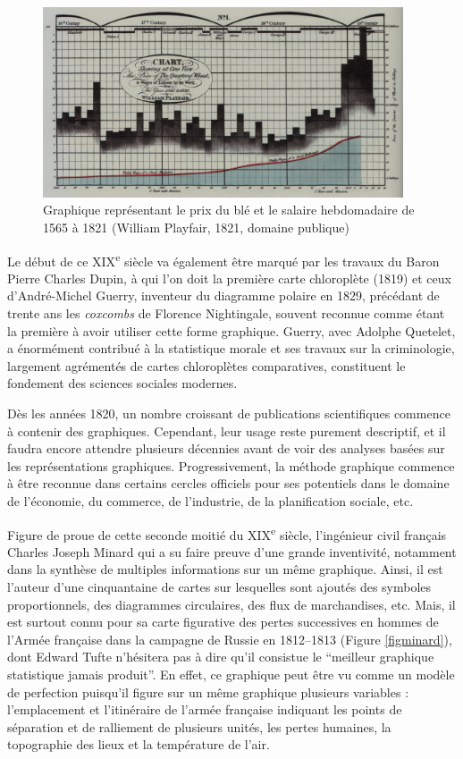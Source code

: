 \documentclass[]{article}
\begin{document}
\begin{figure}
\centering
\includegraphics[width=0.95\textwidth,height=\textheight]{img/chap1/playfair.png}
\caption{Graphique représentant le prix du blé et le salaire hebdomadaire de 1565 à 1821 (William Playfair, 1821, domaine publique)}
\end{figure}

Le début de ce XIX\textsuperscript{e} siècle va également être marqué par les travaux du Baron Pierre Charles Dupin, à qui l'on doit la première carte chloroplète (1819) et ceux d'André-Michel Guerry, inventeur du diagramme polaire en 1829, précédant de trente ans les \emph{coxcombs} de Florence Nightingale, souvent reconnue comme étant la première à avoir utiliser cette forme graphique. Guerry, avec Adolphe Quetelet, a énormément contribué à la statistique morale et ses travaux sur la criminologie, largement agrémentés de cartes chloroplètes comparatives, constituent le fondement des sciences sociales modernes.

Dès les années 1820, un nombre croissant de publications scientifiques commence à contenir des graphiques. Cependant, leur usage reste purement descriptif, et il faudra encore attendre plusieurs décennies avant de voir des analyses basées sur les représentations graphiques. Progressivement, la méthode graphique commence à être reconnue dans certains cercles officiels pour ses potentiels dans le domaine de l'économie, du commerce, de l'industrie, de la planification sociale, etc.

Figure de proue de cette seconde moitié du XIX\textsuperscript{e} siècle, l'ingénieur civil français Charles Joseph Minard qui a su faire preuve d'une grande inventivité, notamment dans la synthèse de multiples informations sur un même graphique. Ainsi, il est l'auteur d'une cinquantaine de cartes sur lesquelles sont ajoutés des symboles proportionnels, des diagrammes circulaires, des flux de marchandises, etc. Mais, il est surtout connu pour sa carte figurative des pertes successives en hommes de l'Armée française dans la campagne de Russie en 1812--1813 (Figure \ref{figminard}), dont Edward Tufte n'hésitera pas à dire qu'il consistue le ``meilleur graphique statistique jamais produit''. En effet, ce graphique peut être vu comme un modèle de perfection puisqu'il figure sur un même graphique plusieurs variables : l'emplacement et l'itinéraire de l'armée française indiquant les points de séparation et de ralliement de plusieurs unités, les pertes humaines, la topographie des lieux et la température de l'air.
\end{document}
